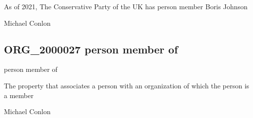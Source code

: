 \documentclass[letterpaper,10pt,english]{sphinxmanual}
\begin{document}
\begin{sphinxShadowBox}

\sphinxAtStartPar
As of 2021, The Conservative Party of the UK has person member Boris Johnson
\end{sphinxShadowBox}

\begin{sphinxShadowBox}

\sphinxAtStartPar
Michael Conlon 
\end{sphinxShadowBox}
\begin{quote}

\ignorespaces \end{quote}


\subsection{ORG\_2000027 \sphinxhyphen{} person member of}
\label{\detokenize{doc-ORG_2000027:org-2000027-person-member-of}}\label{\detokenize{doc-ORG_2000027:index-0}}\label{\detokenize{doc-ORG_2000027::doc}}
\begin{sphinxShadowBox}

\sphinxAtStartPar
person member of
\end{sphinxShadowBox}

\begin{sphinxShadowBox}

\sphinxAtStartPar
{}
\end{sphinxShadowBox}

\begin{sphinxShadowBox}

\sphinxAtStartPar
The property that associates a person with an organization of which the person is a member
\end{sphinxShadowBox}

\begin{sphinxShadowBox}

\sphinxAtStartPar
Michael Conlon 
\end{sphinxShadowBox}
\end{document}
